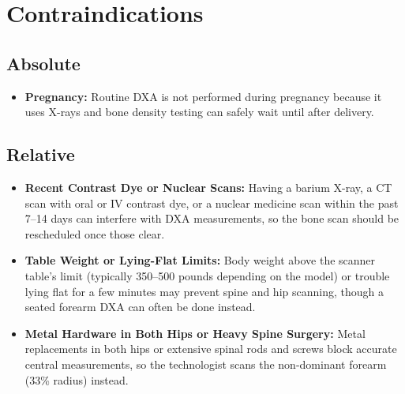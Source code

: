 \section{Contraindications}

\subsection{Absolute}
\begin{itemize}
\item \textbf{Pregnancy:} Routine DXA is not performed during pregnancy because it uses X-rays and bone density testing can safely wait until after delivery.
\end{itemize}

\subsection{Relative}
\begin{itemize}
\item \textbf{Recent Contrast Dye or Nuclear Scans:} Having a barium X-ray, a CT scan with oral or IV contrast dye, or a nuclear medicine scan within the past 7--14 days can interfere with DXA measurements, so the bone scan should be rescheduled once those clear.
\item \textbf{Table Weight or Lying-Flat Limits:} Body weight above the scanner table's limit (typically 350--500 pounds depending on the model) or trouble lying flat for a few minutes may prevent spine and hip scanning, though a seated forearm DXA can often be done instead.
\item \textbf{Metal Hardware in Both Hips or Heavy Spine Surgery:} Metal replacements in both hips or extensive spinal rods and screws block accurate central measurements, so the technologist scans the non-dominant forearm (33\% radius) instead.
\end{itemize}

